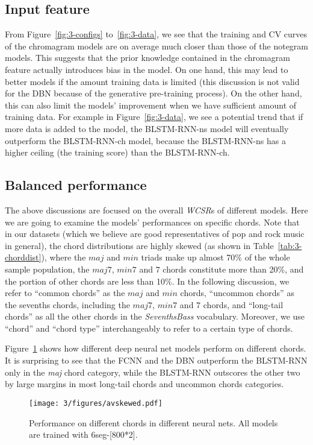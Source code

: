 \subsection{Input feature}\label{sec:3-p6}
From Figure~\ref{fig:3-configs} to~\ref{fig:3-data}, we see that the training and CV curves of the chromagram models are on average much closer than those of the notegram models. This suggests that the prior knowledge contained in the chromagram feature actually introduces bias in the model. On one hand, this may lead to better models if the amount training data is limited (this discussion is not valid for the DBN because of the generative pre-training process). On the other hand, this can also limit the models' improvement when we have sufficient amount of training data. For example in Figure~\ref{fig:3-data}, we see a potential trend that if more data is added to the model, the BLSTM-RNN-ns model will eventually outperform the BLSTM-RNN-ch model, because the BLSTM-RNN-ns has a higher ceiling (the training score) than the BLSTM-RNN-ch.

\subsection{Balanced performance}\label{sec:3-p7}
The above discussions are focused on the overall \textit{WCSR}s of different models. Here we are going to examine the models' performances on specific chords. Note that in our datasets (which we believe are good representatives of pop and rock music in general), the chord distributions are highly skewed (as shown in Table~\ref{tab:3-chorddist}), where the $maj$ and $min$ triads make up almost 70\% of the whole sample population, the $maj7$, $min7$ and $7$ chords constitute more than 20\%, and the portion of other chords are less than 10\%. In the following discussion, we refer to ``common chords'' as the $maj$ and $min$ chords, ``uncommon chords'' as the sevenths chords, including the $maj7$, $min7$ and $7$ chords, and ``long-tail chords'' as all the other chords in the \textit{SeventhsBass} vocabulary. Moreover, we use ``chord'' and ``chord type'' interchangeably to refer to a certain type of chords.

Figure~\ref{fig:3-skewed} shows how different deep neural net models perform on different chords. It is surprising to see that the FCNN and the DBN outperform the BLSTM-RNN only in the \textit{maj} chord category, while the BLSTM-RNN outscores the other two by large margins in most long-tail chords and uncommon chords categories.
\begin{figure}[h!]
	\centering
	\texttt{[image: 3/figures/avskewed.pdf]}
	\caption{Performance on different chords in different neural nets. All models are trained with 6seg-[800*2].}
	\label{fig:3-skewed}
\end{figure}

